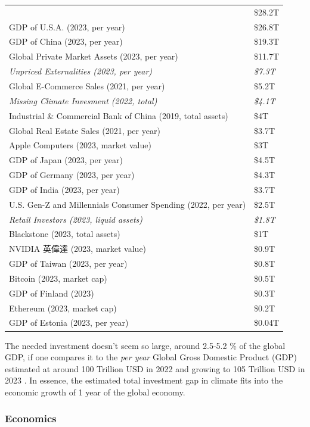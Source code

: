 \documentclass[
  letterpaper,
  DIV=11,
  numbers=noendperiod]{scrartcl}
\begin{document}
\begin{longtable}[]{@{}
  >{\raggedright\arraybackslash}p{}
  >{\raggedright\arraybackslash}p{}@{}}
& \$28.2T \\
GDP of U.S.A. (2023, per year) & \$26.8T \\
GDP of China (2023, per year) & \$19.3T \\
Global Private Market Assets (2023, per year) & \$11.7T \\
\emph{Unpriced Externalities (2023, per year)} & \emph{\$7.3T} \\
Global E-Commerce Sales (2021, per year) & \$5.2T \\
\emph{Missing Climate Invesment (2022, total)} & \emph{\$4.1T} \\
Industrial \& Commercial Bank of China (2019, total assets) & \$4T \\
Global Real Estate Sales (2021, per year) & \$3.7T \\
Apple Computers (2023, market value) & \$3T \\
GDP of Japan (2023, per year) & \$4.5T \\
GDP of Germany (2023, per year) & \$4.3T \\
GDP of India (2023, per year) & \$3.7T \\
U.S. Gen-Z and Millennials Consumer Spending (2022, per year) &
\$2.5T \\
\emph{Retail Investors (2023, liquid assets)} & \emph{\$1.8T} \\
Blackstone (2023, total assets) & \$1T \\
NVIDIA 英偉達 (2023, market value) & \$0.9T \\
GDP of Taiwan (2023, per year) & \$0.8T \\
Bitcoin (2023, market cap) & \$0.5T \\
GDP of Finland (2023) & \$0.3T \\
Ethereum (2023, market cap) & \$0.2T \\
GDP of Estonia (2023, per year) & \$0.04T \\
\end{longtable}

The needed investment doesn't seem so large, around 2.5-5.2 \% of the
global GDP, if one compares it to the \emph{per year} Global Gross
Domestic Product (GDP) estimated at around 100 Trillion USD in 2022 and
growing to 105 Trillion USD in 2023
\citep{aarononeillGlobalGDP198520282023, IMFWorldEconomicOutlook2023}.
In essence, the estimated total investment gap in climate fits into the
economic growth of 1 year of the global economy.

\subsubsection{Economics}\label{economics}
\end{document}
